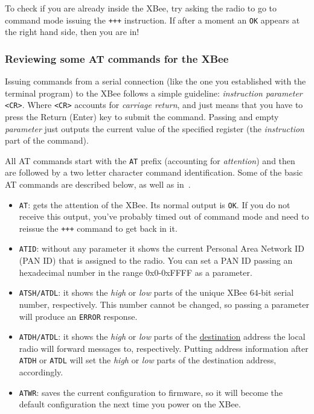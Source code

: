 To check if you are already inside the XBee, try asking the radio to go to command mode issuing the \texttt{+++} instruction. If after a moment an \texttt{OK} appears at the right hand side, then you are in!

\subsubsection{Reviewing some AT commands for the XBee}

Issuing commands from a serial connection (like the one you established with the terminal program) to the XBee follows a simple guideline: \emph{instruction parameter} \texttt{<CR>}. Where \texttt{<CR>} accounts for \emph{carriage return}, and just means that you have to press the Return (Enter) key to submit the command. Passing and empty \emph{parameter} just outputs the current value of the specified register (the \emph{instruction} part of the command).

All AT commands start with the \texttt{AT} prefix (accounting for \emph{attention}) and then are followed by a two letter character command identification. Some of the basic AT commands are described below, as well as in~\cite{faludi2010bws}.

\begin{itemize}
	\item \texttt{AT}: gets the attention of the XBee. Its normal output is \texttt{OK}. If you do not receive this output,  you've probably timed out of command mode and need to reissue the \texttt{+++} command to get back in it.
	\item \texttt{ATID}: without any parameter it shows the current Personal Area Network ID (PAN ID) that is assigned to the radio. You can set a PAN ID passing an hexadecimal number in the range $0$x$0$-$0$xFFFF as a parameter.
	\item \texttt{ATSH/ATDL}: it shows the \emph{high} or \emph{low} parts of the unique XBee $64$-bit serial number, respectively. This number cannot be changed, so passing a parameter will produce an \texttt{ERROR} response.
	\item \texttt{ATDH/ATDL}: it shows the \emph{high} or \emph{low} parts of the \underline{destination} address the local radio will forward messages to, respectively. Putting address information after \texttt{ATDH} or \texttt{ATDL} will set the \emph{high} or \emph{low} parts of the destination address, accordingly.
	\item \texttt{ATWR}: saves the current configuration to firmware, so it will become the default configuration the next time you power on the XBee.
\end{itemize}

		
